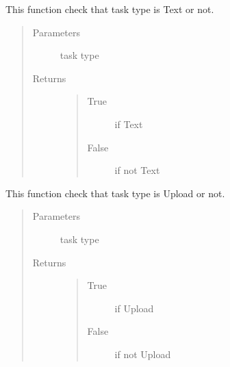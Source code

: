 \documentclass[letterpaper,10pt,english]{sphinxmanual}
\begin{document}

\begin{fulllineitems}
\label{\detokenize{janta:janta.viewhelper.is_text}}
This function check that task type is Text or not.
\begin{quote}\begin{description}
\item[{Parameters}] \leavevmode
{} \textendash{} task type

\item[{Returns}] \leavevmode
\begin{quote}\begin{description}
\item[{True}] \leavevmode
if Text

\item[{False}] \leavevmode
if not Text

\end{description}\end{quote}


\end{description}\end{quote}

\end{fulllineitems}


\begin{fulllineitems}
\label{\detokenize{janta:janta.viewhelper.is_upload}}
This function check that task type is Upload or not.
\begin{quote}\begin{description}
\item[{Parameters}] \leavevmode
{} \textendash{} task type

\item[{Returns}] \leavevmode
\begin{quote}\begin{description}
\item[{True}] \leavevmode
if Upload

\item[{False}] \leavevmode
if not Upload

\end{description}\end{quote}


\end{description}\end{quote}

\end{fulllineitems}
\end{document}
